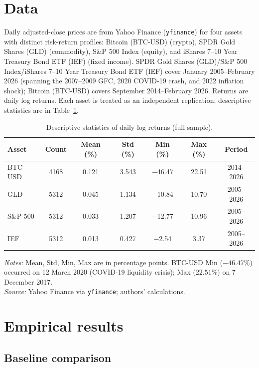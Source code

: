 \documentclass[preprint,12pt,authoryear]{elsarticle}
\newcommand{\BTC}{Bitcoin (BTC-USD)}
\newcommand{\GLD}{SPDR Gold Shares (GLD)}
\newcommand{\SPX}{S\&P 500 Index}
\newcommand{\IEF}{iShares 7--10 Year Treasury Bond ETF (IEF)}
\begin{document}
\section{Data}

Daily adjusted-close prices are from Yahoo Finance (\texttt{yfinance}) for four assets with distinct risk-return profiles: \BTC{} (crypto), \GLD{} (commodity), \SPX{} (equity), and \IEF{} (fixed income). \GLD{}/\SPX{}/\IEF{} cover January 2005--February 2026 (spanning the 2007--2009 GFC, 2020 COVID-19 crash, and 2022 inflation shock); \BTC{} covers September 2014--February 2026. Returns are daily log returns. Each asset is treated as an independent replication; descriptive statistics are in Table~\ref{tab:data_summary}.

\begin{table}[!htbp]
\centering
\small
\setlength{\tabcolsep}{5pt}
\caption{Descriptive statistics of daily log returns (full sample).}
\label{tab:data_summary}
\begin{tabular}{lcccccc}
\toprule
Asset & Count & Mean (\%) & Std (\%) & Min (\%) & Max (\%) & Period \\
\midrule
BTC-USD & 4168 & 0.121 & 3.543 & $-$46.47 & 22.51 & 2014--2026 \\
GLD     & 5312 & 0.045 & 1.134 & $-$10.84 & 10.70 & 2005--2026 \\
S\&P 500 & 5312 & 0.033 & 1.207 & $-$12.77 & 10.96 & 2005--2026 \\
IEF     & 5312 & 0.013 & 0.427 & $-$2.54  & 3.37  & 2005--2026 \\
\bottomrule
\end{tabular}
\medskip
\footnotesize
\textit{Notes:} Mean, Std, Min, Max are in percentage points. BTC-USD Min ($-46.47\%$) occurred on 12 March 2020 (COVID-19 liquidity crisis); Max ($22.51\%$) on 7 December 2017. \\
\textit{Source:} Yahoo Finance via \texttt{yfinance}; authors' calculations.
\end{table}

\section{Empirical results}

\subsection{Baseline comparison}
\end{document}
